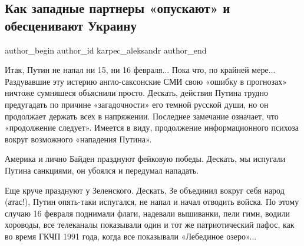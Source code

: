 
 
 
 
 
 
\subsection{Как западные партнеры «опускают» и обесценивают Украину}
\label{sec:17_02_2022.stz.news.ua.fraza.1.kak_zapadnyje_partnery_opuskajut_ukrainu}
 
\ifcmt
 author_begin
   author_id karpec_aleksandr
 author_end
\fi

Итак, Путин не напал ни 15, ни 16 февраля... Пока что, по крайней мере...
Раздувавшие эту истерию англо-саксонские СМИ свою «ошибку в прогнозах» ничтоже
сумняшеся объяснили просто. Дескать, действия Путина трудно предугадать по
причине «загадочности» его темной русской души, но он продолжает держать всех в
напряжении. Последнее замечание означает, что «продолжение следует». Имеется в
виду, продолжение информационного психоза вокруг возможного «нападения Путина».

Америка и лично Байден празднуют фейковую победы. Дескать, мы испугали Путина
санкциями, он убоялся и передумал нападать.

Еще круче празднуют у Зеленского. Дескать, Зе объединил вокруг себя народ
(атас!), Путин опять-таки испугался, не напал и начал отводить войска. По этому
случаю 16 февраля поднимали флаги, надевали вышиванки, пели гимн, водили
хороводы, все телеканалы показывали один и тот же патриотический пафос, как во
время ГКЧП 1991 года, когда все показывали «Лебединое озеро»...




